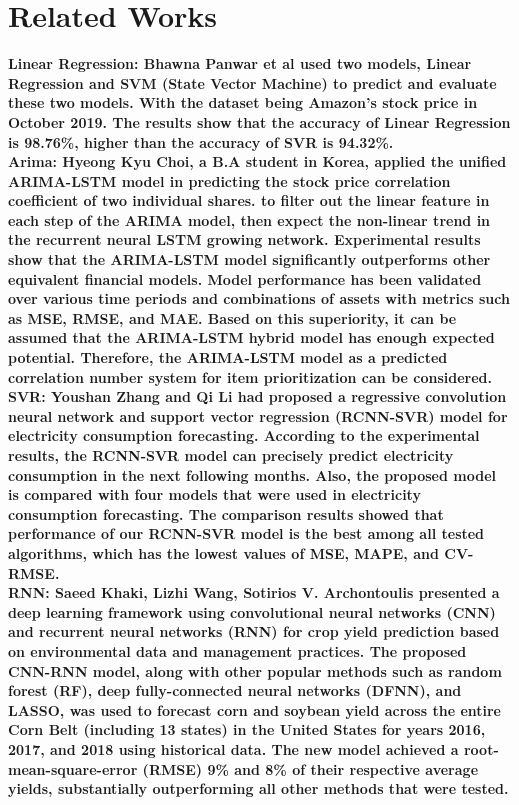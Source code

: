 \documentclass{ieeeojies}
\begin{document}
\section{Related Works}
\label{sec:related works} 
\bfseries Linear Regression:
\mdseries Bhawna Panwar et al used two models, Linear Regression and SVM (State Vector Machine) to predict and evaluate these two models. With the dataset being Amazon's stock price in October 2019. The results show that the accuracy of Linear Regression is 98.76\%, higher than the accuracy of SVR is 94.32\%. \cite{related_lr}
\\
\bfseries Arima:
\mdseries Hyeong Kyu Choi, a B.A student in Korea, applied the unified ARIMA-LSTM model in predicting the stock price correlation coefficient of two individual shares. to filter out the linear feature in each step of the ARIMA model, then expect the non-linear trend in the recurrent neural LSTM growing network. Experimental results show that the ARIMA-LSTM model significantly outperforms other equivalent financial models. Model performance has been validated over various time periods and combinations of assets with metrics such as MSE, RMSE, and MAE. Based on this superiority, it can be assumed that the ARIMA-LSTM hybrid model has enough expected potential. Therefore, the ARIMA-LSTM model as a predicted correlation number system for item prioritization can be considered. \cite{related_arima}\\
\bfseries SVR:
\mdseries Youshan Zhang and Qi Li had proposed a regressive convolution neural network and support vector regression (RCNN-SVR) model for electricity consumption forecasting. According to the experimental results, the RCNN-SVR model can precisely predict electricity consumption in the next following months. Also, the proposed model is compared with four models that were used in electricity consumption forecasting. The comparison results showed that performance of our RCNN-SVR model is the best among all tested algorithms, which has the lowest values of MSE, MAPE, and CV-RMSE. \cite{related_svr}\\
\bfseries RNN:
\mdseries Saeed Khaki, Lizhi Wang, Sotirios V. Archontoulis presented a deep learning framework using convolutional neural networks (CNN) and recurrent neural networks (RNN) for crop yield prediction based on environmental data and management practices. The proposed CNN-RNN model, along with other popular methods such as random forest (RF), deep fully-connected neural networks (DFNN), and LASSO, was used to forecast corn and soybean yield across the entire Corn Belt (including 13 states) in the United States for years 2016, 2017, and 2018 using historical data. The new model achieved a root-mean-square-error (RMSE) 9\% and 8\% of their respective average yields, substantially outperforming all other methods that were tested. \cite{related_rnn}
\end{document}
